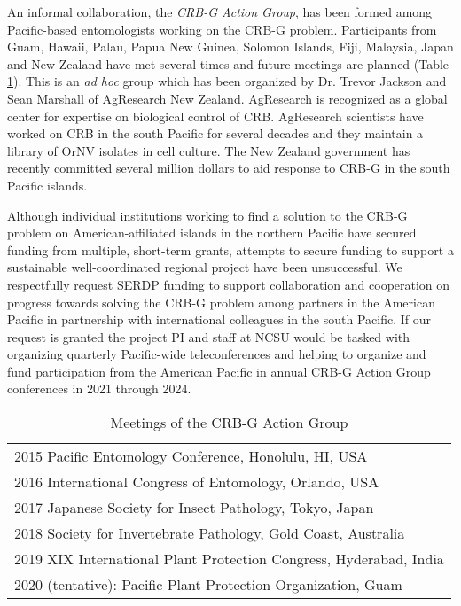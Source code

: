\documentclass[12pt,letterpaper,english]{scrartcl}
\begin{document}
An informal collaboration, the \textit{CRB-G Action Group}, has been formed among Pacific-based entomologists working on the CRB-G problem. Participants from Guam, Hawaii, Palau, Papua New Guinea, Solomon Islands, Fiji, Malaysia, Japan and New Zealand have met several times and future meetings are planned (Table \ref{tab:action-group}).  This is an \textit{ad hoc} group which has been organized by Dr. Trevor Jackson and Sean Marshall of AgResearch New Zealand. AgResearch is recognized as a global center for expertise on biological control of CRB. AgResearch scientists have worked on CRB in the south Pacific for several decades and they maintain a library of OrNV isolates in cell culture. The New Zealand government has recently committed several million dollars to aid response to CRB-G in the south Pacific islands.

Although individual institutions working to find a solution to the CRB-G problem on American-affiliated islands in the northern Pacific have secured funding from multiple, short-term grants, attempts to secure funding to support a sustainable well-coordinated regional project have been unsuccessful. We respectfully request SERDP funding to support collaboration and cooperation on progress towards solving the CRB-G problem among partners in the American Pacific in partnership with international colleagues in the south Pacific. If our request is granted the project PI and staff at NCSU would be tasked with organizing quarterly Pacific-wide teleconferences and helping to organize and fund participation from the American Pacific in annual CRB-G Action Group conferences in 2021 through 2024.

\begin{table}[h]
	\centering
	\caption{Meetings of the CRB-G Action Group}
	\begin{tabular}{l}
		\toprule
		2015 Pacific Entomology Conference, Honolulu, HI, USA \\
		2016 International Congress of Entomology, Orlando, USA \\
		2017 Japanese Society for Insect Pathology, Tokyo, Japan \\
		2018 Society for Invertebrate Pathology, Gold Coast, Australia \\
		2019 XIX International Plant Protection Congress, Hyderabad, India \\
		2020 (tentative): Pacific Plant Protection Organization, Guam \\
		\bottomrule
	\end{tabular}
	\label{tab:action-group}
\end{table}	
\end{document}
